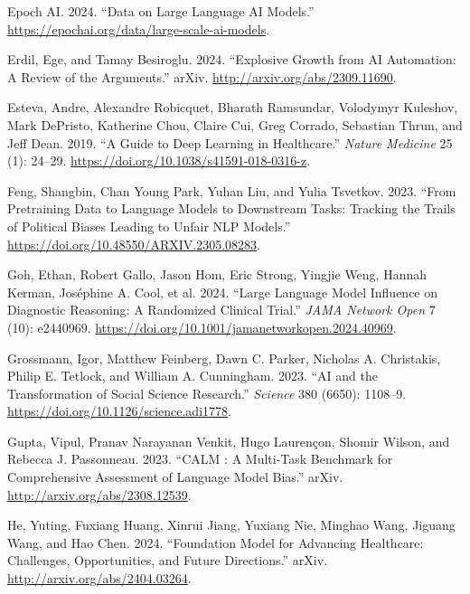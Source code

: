 \documentclass[
  Letterpaper,
]{scrbook}
\newlength{\cslhangindent}
\newenvironment{CSLReferences}[2] %
 {\begin{list}{}{%
  \setlength{\itemindent}{0pt}
  \setlength{\leftmargin}{0pt}
  \setlength{\parsep}{0pt}
  \ifodd #1
   \setlength{\leftmargin}{\cslhangindent}
   \setlength{\itemindent}{-1\cslhangindent}
  \fi
  \setlength{\itemsep}{#2\baselineskip}}}
 {\end{list}}
\begin{document}
\begin{CSLReferences}{1}{0}
Epoch AI. 2024. {``Data on {Large} {Language} {AI} {Models}.''}
\url{https://epochai.org/data/large-scale-ai-models}.

Erdil, Ege, and Tamay Besiroglu. 2024. {``Explosive Growth from {AI}
Automation: {A} Review of the Arguments.''} arXiv.
\url{http://arxiv.org/abs/2309.11690}.

Esteva, Andre, Alexandre Robicquet, Bharath Ramsundar, Volodymyr
Kuleshov, Mark DePristo, Katherine Chou, Claire Cui, Greg Corrado,
Sebastian Thrun, and Jeff Dean. 2019. {``A Guide to Deep Learning in
Healthcare.''} \emph{Nature Medicine} 25 (1): 24--29.
\url{https://doi.org/10.1038/s41591-018-0316-z}.

Feng, Shangbin, Chan Young Park, Yuhan Liu, and Yulia Tsvetkov. 2023.
{``From {Pretraining} {Data} to {Language} {Models} to {Downstream}
{Tasks}: {Tracking} the {Trails} of {Political} {Biases} {Leading} to
{Unfair} {NLP} {Models}.''}
\url{https://doi.org/10.48550/ARXIV.2305.08283}.

Goh, Ethan, Robert Gallo, Jason Hom, Eric Strong, Yingjie Weng, Hannah
Kerman, Joséphine A. Cool, et al. 2024. {``Large {Language} {Model}
{Influence} on {Diagnostic} {Reasoning}: {A} {Randomized} {Clinical}
{Trial}.''} \emph{JAMA Network Open} 7 (10): e2440969.
\url{https://doi.org/10.1001/jamanetworkopen.2024.40969}.

Grossmann, Igor, Matthew Feinberg, Dawn C. Parker, Nicholas A.
Christakis, Philip E. Tetlock, and William A. Cunningham. 2023. {``{AI}
and the Transformation of Social Science Research.''} \emph{Science} 380
(6650): 1108--9. \url{https://doi.org/10.1126/science.adi1778}.

Gupta, Vipul, Pranav Narayanan Venkit, Hugo Laurençon, Shomir Wilson,
and Rebecca J. Passonneau. 2023. {``{CALM} : {A} {Multi}-Task
{Benchmark} for {Comprehensive} {Assessment} of {Language} {Model}
{Bias}.''} arXiv. \url{http://arxiv.org/abs/2308.12539}.

He, Yuting, Fuxiang Huang, Xinrui Jiang, Yuxiang Nie, Minghao Wang,
Jiguang Wang, and Hao Chen. 2024. {``Foundation {Model} for {Advancing}
{Healthcare}: {Challenges}, {Opportunities}, and {Future}
{Directions}.''} arXiv. \url{http://arxiv.org/abs/2404.03264}.


\end{CSLReferences}
\end{document}
